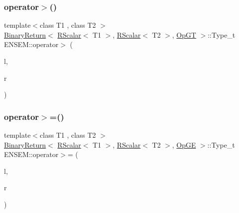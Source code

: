 \mbox{\label{group__rscalar_ga7e63d3683975042d12f1fb51499b95ff}} 
\subsubsection{\texorpdfstring{operator$>$()}{operator>()}}
{\footnotesize\ttfamily template$<$class T1 , class T2 $>$ \\
\mbox{\hyperlink{structENSEM_1_1BinaryReturn}{Binary\+Return}}$<$ \mbox{\hyperlink{classENSEM_1_1RScalar}{R\+Scalar}}$<$ T1 $>$, \mbox{\hyperlink{classENSEM_1_1RScalar}{R\+Scalar}}$<$ T2 $>$, \mbox{\hyperlink{structENSEM_1_1OpGT}{Op\+GT}} $>$\+::Type\+\_\+t E\+N\+S\+E\+M\+::operator$>$ (\begin{DoxyParamCaption}\item[{const \mbox{\hyperlink{classENSEM_1_1RScalar}{R\+Scalar}}$<$ T1 $>$ \&}]{l,  }\item[{const \mbox{\hyperlink{classENSEM_1_1RScalar}{R\+Scalar}}$<$ T2 $>$ \&}]{r }\end{DoxyParamCaption})\hspace{0.3cm}{\ttfamily [inline]}}

\mbox{\label{group__rscalar_ga48e571bcedcc6e54b313673e6c64b759}} 
\subsubsection{\texorpdfstring{operator$>$=()}{operator>=()}}
{\footnotesize\ttfamily template$<$class T1 , class T2 $>$ \\
\mbox{\hyperlink{structENSEM_1_1BinaryReturn}{Binary\+Return}}$<$ \mbox{\hyperlink{classENSEM_1_1RScalar}{R\+Scalar}}$<$ T1 $>$, \mbox{\hyperlink{classENSEM_1_1RScalar}{R\+Scalar}}$<$ T2 $>$, \mbox{\hyperlink{structENSEM_1_1OpGE}{Op\+GE}} $>$\+::Type\+\_\+t E\+N\+S\+E\+M\+::operator$>$= (\begin{DoxyParamCaption}\item[{const \mbox{\hyperlink{classENSEM_1_1RScalar}{R\+Scalar}}$<$ T1 $>$ \&}]{l,  }\item[{const \mbox{\hyperlink{classENSEM_1_1RScalar}{R\+Scalar}}$<$ T2 $>$ \&}]{r }\end{DoxyParamCaption})\hspace{0.3cm}{\ttfamily [inline]}}

